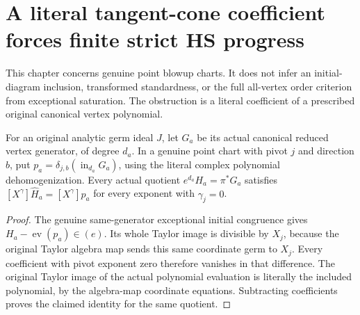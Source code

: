 \section{A literal tangent-cone coefficient forces finite strict HS progress}

This chapter concerns genuine point blowup charts. It does not infer an
initial-diagram inclusion, transformed standardness, or the full all-vertex
order criterion from exceptional saturation. The obstruction is a literal
coefficient of a prescribed original canonical vertex polynomial.

\begin{theorem}
\label{hir:actual-point-canonical-quotient-pure-coefficient}
\leanok
For an original analytic germ ideal $J$, let $G_a$ be its actual canonical
reduced vertex generator, of degree $d_a$. In a genuine point chart with
pivot $j$ and direction $b$, put
$p_a=\delta_{j,b}(\operatorname{in}_{d_a}G_a)$, using the literal complex
polynomial dehomogenization. Every actual quotient
$e^{d_a}H_a=\pi^*G_a$ satisfies
$[X^\gamma]\widehat H_a=[X^\gamma]p_a$ for every exponent with
$\gamma_j=0$.
\end{theorem}
\begin{proof}
The genuine same-generator exceptional initial congruence gives
$H_a-\operatorname{ev}(p_a)\in(e)$. Its whole Taylor image is divisible
by $X_j$, because the original Taylor algebra map sends this same
coordinate germ to $X_j$. Every coefficient with pivot exponent zero
therefore vanishes in that difference. The original Taylor image of
the actual polynomial evaluation is literally the included polynomial,
by the algebra-map coordinate equations. Subtracting coefficients
proves the claimed identity for the same quotient.
\end{proof}

